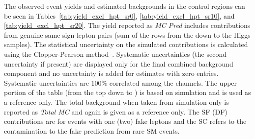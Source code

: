 The observed event yields and estimated backgrounds in the \hpt
control regions can be seen in Tables~\ref{tab:yield_excl_hpt_sr0},
\ref{tab:yield_excl_hpt_sr10}, and \ref{tab:yield_excl_hpt_sr20}. The yield
reported as {\it MC Pred} includes contributions from genuine same-sign lepton
pairs (sum of the rows from the \Wgamma down to the Higgs samples). The
statistical uncertainty on the simulated contributions is calculated using the
Clopper-Pearson method~\cite{clopperpearson}. Systematic uncertainties (the second uncertainty if
present) are displayed only for the final combined background component and no
uncertainty is added for estimates with zero entries. Systematic uncertainties
are 100\% correlated among the channels. The upper portion of the table (from
the top down to \ZZ) is based on simulation and is used as a reference only.
The total background when taken from simulation only is reported as {\it Total
MC} and again is given as a reference only. The SF (DF) contributions are for
events with one (two) fake leptons and the SC refers to the contamination to the
fake prediction from rare SM events.
\begin{table}[!hbt]
\begin{center}
\caption[High \pt baseline yields and predictions with no b-tagged jets requirement (Signal Region 0)]
{\label{tab:yield_excl_hpt_sr0}\footnotesize{
\exclhptnamerZERO
\exclhptcutsrZERO
\exclcaption
}
}
\end{center} 
\resizebox{0.63\textwidth}{!}{\begin{minipage}{\textwidth}
 
\end{minipage} 
}
\end{table}
\clearpage
\begin{table}[!hbt]
\begin{center}
\caption[High \pt baseline yields and predictions with exaclty 1 b-tagged jet (Signal Region 10)]
{\label{tab:yield_excl_hpt_sr10}\footnotesize{
\exclhptnamerONEZERO
\exclhptcutsrONEZERO
\exclcaption
}
}
\end{center} 
\resizebox{0.65\textwidth}{!}{\begin{minipage}{\textwidth}

\end{minipage} 
}
\end{table}
